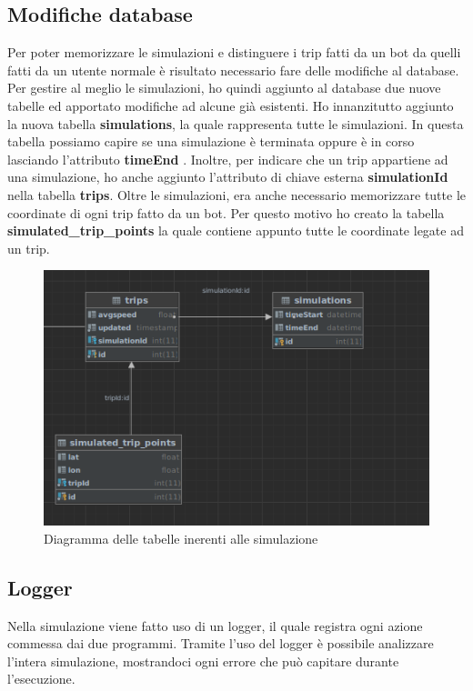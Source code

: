 \documentclass[main.tex]{subfiles}
\begin{document}
\subsection{Modifiche database}
Per poter memorizzare le simulazioni e distinguere i trip fatti da un bot da quelli fatti da un utente normale è risultato necessario fare delle modifiche al database.\newline
Per gestire al meglio le simulazioni, ho quindi aggiunto al database due nuove tabelle ed apportato modifiche ad alcune già esistenti.\newline
Ho innanzitutto aggiunto la nuova tabella \textbf{simulations}, la quale rappresenta tutte le simulazioni. In questa tabella possiamo capire se una simulazione è terminata oppure è in corso lasciando l'attributo \textbf{timeEnd} . Inoltre, per indicare che un trip appartiene ad una simulazione, ho anche aggiunto l'attributo di chiave esterna \textbf{simulationId} nella tabella \textbf{trips}. \newline
Oltre le simulazioni, era anche necessario memorizzare tutte le coordinate di ogni trip fatto da un bot. Per questo motivo ho creato la tabella \textbf{simulated\_trip\_points} la quale contiene appunto tutte le coordinate legate ad un trip.


    \begin{figure}[H]
        \centering
        \includegraphics[width=1\linewidth]       {img/simulazione/db.png}
        \caption{Diagramma delle tabelle inerenti alle simulazione}
        \label{fig:db}
    \end{figure}

\subsection{Logger}
Nella simulazione viene fatto uso di un logger, il quale registra ogni azione commessa dai due programmi. Tramite l'uso del logger è possibile analizzare l'intera simulazione, mostrandoci ogni errore che può capitare durante l'esecuzione. 
\end{document}
